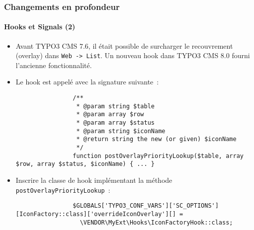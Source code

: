 \begin{frame}[fragile]
	\frametitle{Changements en profondeur}
	\framesubtitle{Hooks et Signals (2)}

	\lstset{basicstyle=\tiny\ttfamily}

	\begin{itemize}

		\item Avant TYPO3 CMS 7.6, il était possible de surcharger le recouvrement (overlay) dans \texttt{Web -> List}.
			Un nouveau hook dans TYPO3 CMS 8.0 fourni l'ancienne fonctionnalité.

		\item Le hook est appelé avec la signature suivante~:
			\begin{lstlisting}
				/**
				 * @param string $table
				 * @param array $row
				 * @param array $status
				 * @param string $iconName
				 * @return string the new (or given) $iconName
				 */
				function postOverlayPriorityLookup($table, array $row, array $status, $iconName) { ... }
			\end{lstlisting}

		\item Inscrire la classe de hook implémentant la méthode \texttt{postOverlayPriorityLookup}~:

			\begin{lstlisting}
				$GLOBALS['TYPO3_CONF_VARS']['SC_OPTIONS'][IconFactory::class]['overrideIconOverlay'][] =
				  \VENDOR\MyExt\Hooks\IconFactoryHook::class;
			\end{lstlisting}

	\end{itemize}

\end{frame}

